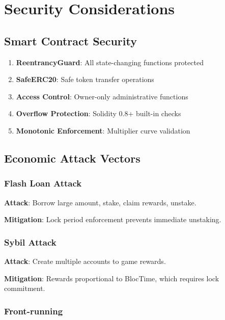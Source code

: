\documentclass[12pt,a4paper]{article}
\begin{document}
\section{Security Considerations}

\subsection{Smart Contract Security}

\begin{tcolorbox}[colback=red!5,colframe=red,title=Security Measures]
\begin{enumerate}
    \item \textbf{ReentrancyGuard}: All state-changing functions protected
    \item \textbf{SafeERC20}: Safe token transfer operations
    \item \textbf{Access Control}: Owner-only administrative functions
    \item \textbf{Overflow Protection}: Solidity 0.8+ built-in checks
    \item \textbf{Monotonic Enforcement}: Multiplier curve validation
\end{enumerate}
\end{tcolorbox}

\subsection{Economic Attack Vectors}

\subsubsection{Flash Loan Attack}

\textbf{Attack}: Borrow large amount, stake, claim rewards, unstake.

\textbf{Mitigation}: Lock period enforcement prevents immediate unstaking.

\subsubsection{Sybil Attack}

\textbf{Attack}: Create multiple accounts to game rewards.

\textbf{Mitigation}: Rewards proportional to BlocTime, which requires lock commitment.

\subsubsection{Front-running}
\end{document}
